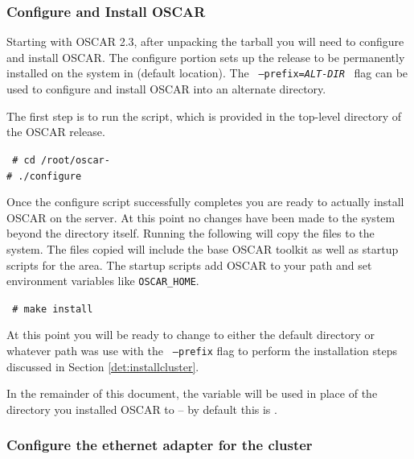 
\subsubsection{Configure and Install OSCAR}
\label{det:configure-install}

Starting with OSCAR 2.3, after unpacking the tarball you will need
to configure and install OSCAR.  The configure portion sets up the
release to be permanently installed on the system in
 (default location).  The {\tt
--prefix=\emph{ALT-DIR}} $\,$ flag can be used to configure and
install OSCAR into an alternate directory.

The first step is to run the  script, which is provided in
the top-level directory of the OSCAR release.

  \vspace{11pt} {\tt
          \# cd /root/oscar-\oscarversion \\
  \indent \# ./configure }  \vspace{11pt}

Once the configure script successfully completes you are ready to
actually install OSCAR on the server.  At this point no changes have
been made to the system beyond the 
directory itself.  Running the following will copy the files to the
system.  The files copied will include the base OSCAR toolkit as
well as startup scripts for the  area.  The startup
scripts add OSCAR to your path and set environment variables like
{\tt OSCAR\_HOME}.

  \vspace{11pt} {\tt
  \indent \# make install} \vspace{11pt}


At this point you will be ready to change to either the default
 directory or whatever path was use with the {\tt
--prefix} flag to perform the installation steps discussed in Section
\ref{det:installcluster}.

In the remainder of this document, the variable 
will be used in place of the directory you installed OSCAR to -- by
default this is .



\subsubsection{Configure the ethernet adapter for the cluster}
\label{det:serveradapter}

